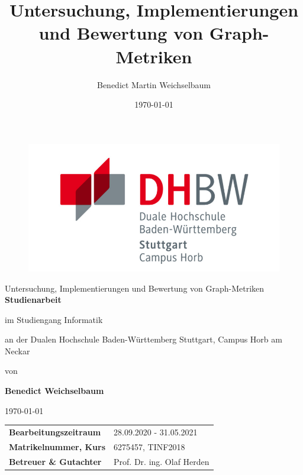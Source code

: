 \documentclass[a4paper,12pt,ngerman,chapterprefix=false,listof=totoc,bibliography=totoc]{scrreprt}
\begin{document}
\title{\Large{Untersuchung, Implementierungen und Bewertung von Graph-Metriken
}}
\author{Benedict Martin Weichselbaum}
\date{\today}
\begin{titlepage}
	\centering\hspace{8mm}
	\begin{figure}
		\centering
			\includegraphics[scale=1.3]{./Abbildungen/dhbwlogo.png}
	\end{figure}
	
	\vspace{5mm}	
	{\fontsize{26}{40}\selectfont
	Untersuchung, Implementierungen und Bewertung von Graph-Metriken
	}
	\\
	\vspace{2cm}
	\textbf{\Large{Studienarbeit}} \par
	\vspace{1cm}
	im Studiengang Informatik \par
	\vspace{0.3cm}
	an der Dualen Hochschule Baden-Württemberg Stuttgart, Campus Horb am Neckar \par
	\vspace{1.2cm}
	von \par
	\vspace{0.5cm}
	\textbf{\large{Benedict Weichselbaum}} \par
	\vspace{1.5cm}
	{\today}\par
	\vfill
	\begin{table}[ht]
		\hspace{1,5cm}
		\begin{tabular}{p{7cm}p{7cm}}
			\textbf{Bearbeitungszeitraum} & 28.09.2020 - 31.05.2021\\
			\textbf{Matrikelnummer, Kurs} & 6275457, TINF2018\\
			\textbf{Betreuer \& Gutachter} & Prof. Dr. ing. Olaf Herden\\
		\end{tabular}
	\end{table}
\end{titlepage}
\end{document}

